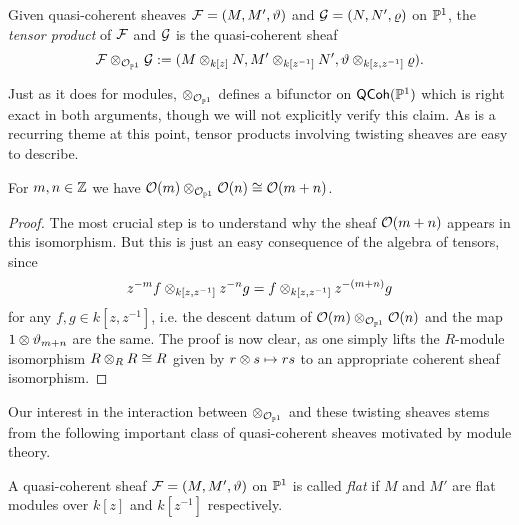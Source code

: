 \begin{definition}
  Given quasi-coherent sheaves $\mathcal{F} = (M, M', \vartheta)$ and
  $\mathcal{G} = (N, N', \varrho)$ on $\mathbb{P}^{{1}}$, the \emph{tensor
  product} of $\mathcal{F}$ and $\mathcal{G}$ is the quasi-coherent sheaf
  \[
    \mathcal{F} \otimes_{\mathcal{O}_{{\mathbb{P}^{{1}}}}} \mathcal{G}
    :=
    (M \otimes_{k[z]} N, M' \otimes_{k[z^{-1}]} N', \vartheta
    \otimes_{k[z, z^{-1}]} \varrho).
  \]
  \vspace{-24pt}
\end{definition}

Just as it does for modules, $\otimes_{\mathcal{O}_{{\mathbb{P}^{{1}}}}}$ defines a bifunctor on
$\operatorname{\mathsf{QCoh}}(\mathbb{P}^{{1}})$ which is right exact in both arguments, though we
will not explicitly verify this claim.
As is a recurring theme at this point, tensor products involving
twisting sheaves are easy to describe.

\begin{proposition}
  \label{prop_shftensor_of_twists}
  For $m, n \in \mathbb{Z}$ we have $\mathcal{O}({m}) \otimes_{\mathcal{O}_{{\mathbb{P}^{{1}}}}} \mathcal{O}({n}) \cong
  \mathcal{O}({m + n})$.
\end{proposition}

\begin{proof}
  The most crucial step is to understand why the sheaf $\mathcal{O}({m +
  n})$ appears in this isomorphism.
  But this is just an easy consequence of the algebra of tensors, since
  \[
    z^{-m} f \otimes_{k[z, z^{-1}]} z^{-n} g = f \otimes_{k[z,
    z^{-1}]} z^{-(m + n)} g
  \]
  for any $f, g \in k[z, z^{-1}]$, i.e. the descent datum of
  $\mathcal{O}({m}) \otimes_{\mathcal{O}_{{\mathbb{P}^{{1}}}}} \mathcal{O}({n})$ and the map $1 \otimes
  \vartheta_{m + n}$ are the same.
  The proof is now clear, as one simply lifts the $R$-module
  isomorphism $R \otimes_R R \cong R$ given by $r \otimes s \mapsto
  rs$ to an appropriate coherent sheaf isomorphism.
\end{proof}

\iffalse
\begin{corollary}
  When $n \geq 0$, we have $\twist{n} = \twist{1}^{\tensor n}$ and
  $\twist{-n} = \twist{-1}^{\tensor n}$.
\end{corollary}
\fi

Our interest in the interaction between $\otimes_{\mathcal{O}_{{\mathbb{P}^{{1}}}}}$ and these
twisting sheaves stems from the following important class of
quasi-coherent sheaves motivated by module theory.

\begin{definition}
  A quasi-coherent sheaf $\mathcal{F} = (M, M', \vartheta)$ on $\mathbb{P}^{{1}}$
  is called \emph{flat} if $M$ and $M'$ are flat modules over $k[z]$
  and $k[z^{-1}]$ respectively.
\end{definition}

